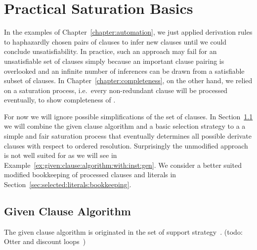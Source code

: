 




\section{Practical Saturation Basics}\label{sec:saturation:basics}

In the examples of Chapter~\ref{chapter:automation},
we just applied derivation rules
to haphazardly chosen pairs of clauses
to infer new clauses
until we could conclude unsatisfiability.
%
In practice, such an approach may fail for an unsatisfiable set of clauses
simply because an important clause pairing is overlooked
and an infinite number of inferences can be drawn
from a satisfiable subset of clauses.
%
In Chapter~\ref{chapter:completeness}, on the other hand,
we relied on a  saturation process,
i.e.~every non-redundant clause will be processed eventually,
to show completeness of \InstGenEQ{}.

For now we will ignore possible simplifications of the set of clauses.
In Section~\ref{sec:given:clause:algorithm}
we will combine the given clause algorithm
and a basic selection strategy to a a simple and fair saturation process
that eventually determines all possible derivate clauses
with respect to ordered resolution.
Surprisingly the unmodified approach is not well suited for \InstGen{} 
as we will see in Example~\ref{ex:given:clause:algorithm:with:inst:gen}.
We consider a better suited modified bookkeeping of processed clauses and literals
in Section~\ref{sec:selected:literals:bookkeeping}.



\subsection{Given Clause Algorithm}\label{sec:given:clause:algorithm}

The given clause algorithm is originated in the set of support strategy~\cite{Wos:1965:ECS:321296.321302}. (todo: Otter and discount loops~\cite{DBLP:conf/cade/SchulzM16})

